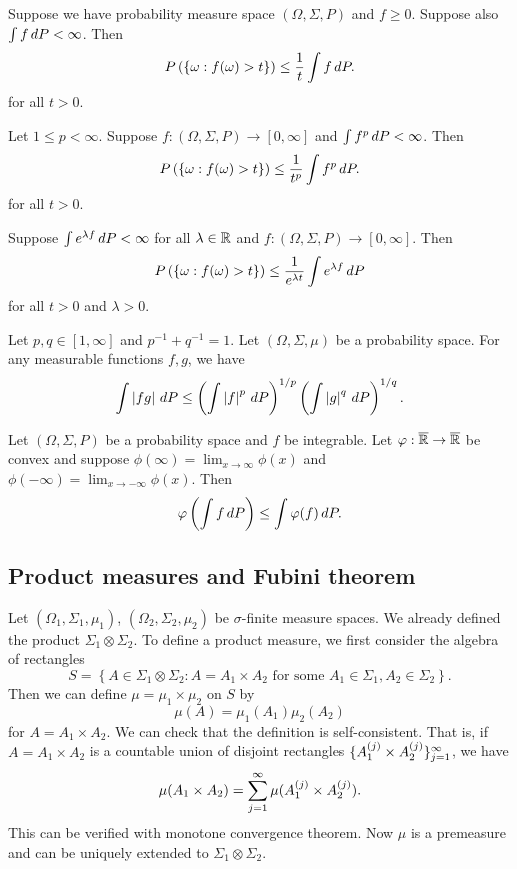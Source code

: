 \documentclass[a4paper]{article}
\begin{document}
\begin{thm}
  Suppose we have probability measure space $(\Omega, \Sigma, P)$
  and $f \geq 0$. Suppose also $\int f \, d P < \infty$. Then
  \[
    P \left( \left\{ \omega : f(\omega) > t \right\} \right)
    \leq \frac{1}{t} \int f \, d P.
  \]
  for all $t > 0$.
\end{thm}

\begin{remark}
  Let $1 \leq p < \infty$. Suppose $f : (\Omega, \Sigma, P) \to
    [0, \infty]$ and $\int f^p \, d P < \infty$. Then
  \[
    P \left( \left\{ \omega : f (\omega) > t \right\} \right)
    \leq \frac{1}{t^p} \int f^p \, d P.
  \]
  for all $t > 0$.
\end{remark}

\begin{remark}
  Suppose $\int e^{\lambda f} \, d P < \infty$ for all
  $\lambda \in \mathbb{R}$ and $f : (\Omega, \Sigma, P) \to [0, \infty]$.
  Then
  \[
    P \left( \left\{ \omega : f (\omega) > t \right\} \right)
    \leq \frac{1}{e^{\lambda t}} \int e^{\lambda f} \, d P
  \]
  for all $t > 0$ and $\lambda > 0$.
\end{remark}

\begin{thm}
  Let $p, q \in [1, \infty]$ and $p^{-1} + q^{-1} = 1$.
  Let $(\Omega, \Sigma, \mu)$ be a probability space. For any
  measurable functions $f, g$, we have
  \[
    \int \left\lvert f g\right\rvert \, d P \leq \left( \int \left\lvert f\right\rvert^p \, d P \right)^{1 / p}
    \left( \int \left\lvert g\right\rvert^q \, d P \right)^{1 / q}.
  \]
\end{thm}

\begin{thm}
  Let $(\Omega, \Sigma, P)$ be a probability space and $f$ be
  integrable. Let $\varphi : \overline{\mathbb{R}} \to \overline{\mathbb{R}}$ be convex
  and suppose $\phi (\infty) = \lim_{x \to \infty} \phi(x)$
  and $\phi (-\infty) = \lim_{x \to -\infty} \phi(x)$. Then
  \[
    \varphi \left( \int f \, d P \right) \leq \int \varphi (f) \, d P.
  \]
\end{thm}

\subsection{Product measures and Fubini theorem}
Let $(\Omega_1, \Sigma_1, \mu_1)$, $(\Omega_2, \Sigma_2, \mu_2)$
be $\sigma$-finite measure spaces. We already defined the product
$\Sigma_1 \otimes \Sigma_2$. To define a product measure, we first
consider the algebra of rectangles
\[
  S = \left\{ A \in \Sigma_1 \otimes \Sigma_2 : A = A_1 \times A_2
  \text{ for some $A_1 \in \Sigma_1, A_2 \in \Sigma_2$} \right\}.
\]
Then we can define $\mu = \mu_1 \times \mu_2$ on $S$ by
\[
  \mu (A) = \mu_1 (A_1) \mu_2 (A_2)
\]
for $A = A_1 \times A_2$. We can check that the definition is
self-consistent. That is, if $A = A_1 \times A_2$ is a countable
union of disjoint rectangles
$\{ A_1^{(j)} \times A_2^{(j)} \}_{j=1}^\infty$, we have
\[
  \mu (A_1 \times A_2) = \sum_{j=1}^\infty \mu ( A_1^{(j)} \times A_2^{(j)} ).
\]
This can be verified with monotone convergence theorem.
Now $\mu$ is a premeasure and can be uniquely
extended to $\Sigma_1 \otimes \Sigma_2$.
\end{document}
